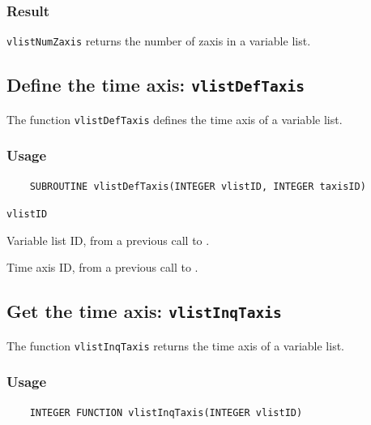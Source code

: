 \subsubsection*{Result}

{\texttt{vlistNumZaxis}} returns the number of zaxis in a variable list.



\subsection{Define the time axis: \texttt{vlistDefTaxis}}
\label{vlistDefTaxis}

The function {\texttt{vlistDefTaxis}} defines the time axis of a variable list.

\subsubsection*{Usage}

\begin{verbatim}
    SUBROUTINE vlistDefTaxis(INTEGER vlistID, INTEGER taxisID)
\end{verbatim}

\hspace*{4mm}\begin{minipage}[]{15cm}
\begin{deflist}{\texttt{vlistID}\ }
\item[\texttt{vlistID}]
Variable list ID, from a previous call to {}.
\item[\texttt{taxisID}]
Time axis ID, from a previous call to {}.

\end{deflist}
\end{minipage}


\subsection{Get the time axis: \texttt{vlistInqTaxis}}
\label{vlistInqTaxis}

The function {\texttt{vlistInqTaxis}} returns the time axis of a variable list.

\subsubsection*{Usage}

\begin{verbatim}
    INTEGER FUNCTION vlistInqTaxis(INTEGER vlistID)
\end{verbatim}


